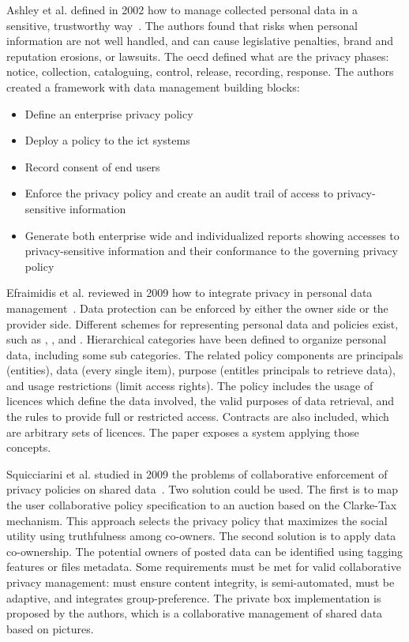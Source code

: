 Ashley et al. defined in 2002 how to manage collected personal data in a sensitive, trustworthy way~\cite{ashley_privacy_2002}. The authors found that risks when personal information are not well handled, and can cause legislative penalties, brand and reputation erosions, or lawsuits. The \gls{oecd} defined what are the privacy phases: notice, collection, cataloguing, control, release, recording, response. The authors created a \gls{framework} with data management building blocks: 
\begin{itemize}
	\item Define an enterprise privacy policy
	\item Deploy a policy to the \gls{ict} systems 
	\item Record consent of end users
	\item Enforce the privacy policy and create an audit trail of access to privacy-sensitive information
	\item Generate both enterprise wide and individualized reports showing accesses to privacy-sensitive information and their conformance to the governing privacy policy
\end{itemize} %

Efraimidis et al. reviewed in 2009 how to integrate privacy in personal data management~\cite{efraimidis_towards_2009}. Data protection can be enforced by either the owner side or the provider side. Different schemes for representing personal data and policies exist, such as , , and . Hierarchical categories have been defined to organize personal data, including some sub categories. The related policy components are principals (entities), data (every single item), purpose (entitles principals to retrieve data), and usage restrictions (limit access rights). The policy includes the usage of licences which define the data involved, the valid purposes of data retrieval, and the rules to provide full or restricted access. Contracts are also included, which are arbitrary sets of licences. The paper exposes a system applying those concepts. %

Squicciarini et al. studied in 2009 the problems of collaborative enforcement of privacy policies on shared data~\cite{squicciarini_collective_2009}. Two solution could be used. The first is to map the user collaborative policy specification to an auction based on the Clarke-Tax mechanism. This approach selects the privacy policy that maximizes the social utility using truthfulness among co-owners. The second solution is to apply data co-ownership. The potential owners of posted data can be identified using tagging features or files \gls{metadata}. Some requirements must be met for valid collaborative privacy management: must ensure content integrity, is semi-automated, must be adaptive, and integrates group-preference. The private box implementation is proposed by the authors, which is a collaborative management of shared data based on pictures. %

